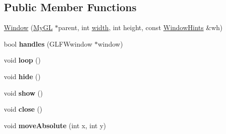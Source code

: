 \subsection*{Public Member Functions}
\begin{DoxyCompactItemize}
\item 
\hyperlink{classWindow_a5996bf7ae672cc3e084d323e4163e4e3}{Window} (\hyperlink{classMyGL}{My\+GL} $\ast$parent, int \hyperlink{classWindow_af5b1c436782cc9752d386493fbc5dc8c}{width}, int height, const \hyperlink{structWindowHints}{Window\+Hints} \&wh)
\item 
bool {\bfseries handles} (G\+L\+F\+Wwindow $\ast$window)\hypertarget{classWindow_aad13ee91d93d4033a6e6a8c9cb4ac71f}{}\label{classWindow_aad13ee91d93d4033a6e6a8c9cb4ac71f}

\item 
void {\bfseries loop} ()\hypertarget{classWindow_a4f45493b0f1be74fcee972da50fb8d67}{}\label{classWindow_a4f45493b0f1be74fcee972da50fb8d67}

\item 
void {\bfseries hide} ()\hypertarget{classWindow_a4626829d3cb9d01285f739d2bbc69b74}{}\label{classWindow_a4626829d3cb9d01285f739d2bbc69b74}

\item 
void {\bfseries show} ()\hypertarget{classWindow_a8f986e19a11c4c97ed8e6ad3d0e648b7}{}\label{classWindow_a8f986e19a11c4c97ed8e6ad3d0e648b7}

\item 
void {\bfseries close} ()\hypertarget{classWindow_a35055c04498121d39741bfcd5082705b}{}\label{classWindow_a35055c04498121d39741bfcd5082705b}

\item 
void {\bfseries move\+Absolute} (int x, int y)\hypertarget{classWindow_a2132a9fc012c4bbabb0167b027578308}{}\label{classWindow_a2132a9fc012c4bbabb0167b027578308}

\end{DoxyCompactItemize}
